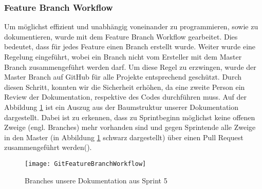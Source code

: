 \subsubsection{Feature Branch Workflow}
Um möglichst effizient und unabhängig voneinander zu programmieren, sowie zu dokumentieren, wurde mit dem Feature Branch Workflow gearbeitet. Dies bedeutet, dass für jedes Feature einen Branch erstellt wurde. Weiter wurde eine Regelung eingeführt, wobei ein Branch nicht vom Ersteller mit dem Master Branch zusammengeführt werden darf. Um diese Regel zu erzwingen, wurde der Master Branch auf GitHub für alle Projekte entsprechend geschützt. Durch diesen Schritt, konnten wir die Sicherheit erhöhen, da eine zweite Person ein Review der Dokumentation, respektive des Codes durchführen muss.
Auf der Abbildung \ref{fig:FeatureBranchWorkflow} ist ein Auszug aus der Baumstruktur unserer Dokumentation dargestellt. Dabei ist zu erkennen, dass zu Sprintbeginn möglichst keine offenen Zweige (engl. Branches) mehr vorhanden sind und gegen Sprintende alle Zweige in den Master (in Abbildung \ref{fig:FeatureBranchWorkflow} schwarz dargestellt) über einen Pull Request zusammengeführt werden(\cite{BaumannWicki2018}).

\begin{figure}[htb]
	\center
	\texttt{[image: GitFeatureBranchWorkflow]}
	\caption{Branches unsere Dokumentation aus Sprint 5}
	\label{fig:FeatureBranchWorkflow}
\end{figure}
